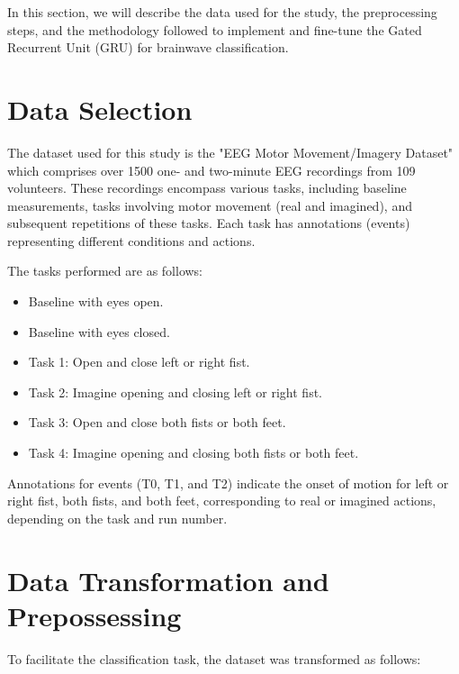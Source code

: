 \documentclass[11pt, a4paper, oneside]{assets/tex/thesis} %
\begin{document}
{In this section, we will describe the data used for the study, the preprocessing steps, and the methodology followed to implement and fine-tune the Gated Recurrent Unit (GRU) for brainwave classification.

\section{Data Selection}

The dataset used for this study is the "EEG Motor Movement/Imagery Dataset"\cite{Dataset:EEG_Motor_Movement/Imagery_Dataset} which comprises over 1500 one- and two-minute EEG recordings from 109 volunteers. These recordings encompass various tasks, including baseline measurements, tasks involving motor movement (real and imagined), and subsequent repetitions of these tasks. Each task has annotations (events) representing different conditions and actions.

The tasks performed are as follows:

\begin{itemize}
    \item Baseline with eyes open.
    \item Baseline with eyes closed.
    \item Task 1: Open and close left or right fist.
    \item Task 2: Imagine opening and closing left or right fist.
    \item Task 3: Open and close both fists or both feet.
    \item Task 4: Imagine opening and closing both fists or both feet.
\end{itemize}
Annotations for events (T0, T1, and T2) indicate the onset of motion for left or right fist, both fists, and both feet, corresponding to real or imagined actions, depending on the task and run number.


\section{Data Transformation and Prepossessing}

To facilitate the classification task, the dataset was transformed as follows:

}
\end{document}
